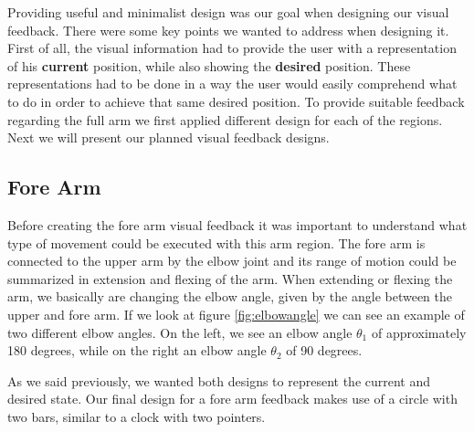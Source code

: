 
Providing useful and minimalist design was our goal when designing our visual feedback. There were some key points we wanted to address when designing it.
First of all, the visual information had to provide the user with a representation of his \textbf{current} position, while also showing the \textbf{desired} position. 
These representations had to be done in a way the user would easily comprehend what to do in order to achieve that same desired position.
To provide suitable feedback regarding the full arm we first applied different design for each of the regions. Next we will present our planned visual feedback designs.

\subsection{Fore Arm}

Before creating the fore arm visual feedback it was important to understand what type of movement could be executed with this arm region.
The fore arm is connected to the upper arm by the elbow joint and its range of motion could be summarized in extension and flexing of the arm.
When extending or flexing the arm, we basically are changing the elbow angle, given by the angle between the upper and fore arm.
If we look at figure \ref{fig:elbowangle} we can see an example of two different elbow angles. 
On the left, we see an elbow angle $\theta$$_1$ of approximately 180 degrees, while on the right an elbow angle $\theta$$_2$ of 90 degrees.  

As we said previously, we wanted both designs to represent the current and desired state. 
Our final design for a fore arm feedback makes use of a circle with two bars, similar to a clock with two pointers.



